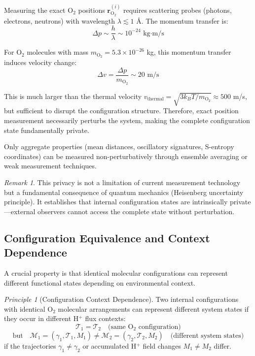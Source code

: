 \documentclass[aps,prd,twocolumn,superscriptaddress,floatfix,nofootinbib]{revtex4-2}
\theoremstyle{remark}
\newtheorem{remark}[theorem]{Remark}
\newtheorem{principle}[theorem]{Principle}
\begin{document}
\begin{justification}
Measuring the exact O$_2$ positions $\mathbf{r}_{\text{O}_2}^{(i)}$ requires scattering probes (photons, electrons, neutrons) with wavelength $\lambda \lesssim 1$ \AA. The momentum transfer is:
$$
\Delta p \sim \frac{h}{\lambda} \sim 10^{-24} \text{ kg·m/s}
$$

For O$_2$ molecules with mass $m_{\text{O}_2} = 5.3 \times 10^{-26}$ kg, this momentum transfer induces velocity change:
$$
\Delta v = \frac{\Delta p}{m_{\text{O}_2}} \sim 20 \text{ m/s}
$$

This is much larger than the thermal velocity $v_{\text{thermal}} = \sqrt{3k_B T / m_{\text{O}_2}} \approx 500$ m/s, but sufficient to disrupt the configuration structure. Therefore, exact position measurement necessarily perturbs the system, making the complete configuration state fundamentally private.

Only aggregate properties (mean distances, oscillatory signatures, S-entropy coordinates) can be measured non-perturbatively through ensemble averaging or weak measurement techniques.
\end{justification}

\begin{remark}
This privacy is not a limitation of current measurement technology but a fundamental consequence of quantum mechanics (Heisenberg uncertainty principle). It establishes that internal configuration states are intrinsically private—external observers cannot access the complete state without perturbation.
\end{remark}

\subsection{Configuration Equivalence and Context Dependence}

A crucial property is that identical molecular configurations can represent different functional states depending on environmental context.

\begin{principle}[Configuration Context Dependence]
\label{princ:nonunique}
Two internal configurations with identical O$_2$ molecular arrangements can represent different system states if they occur in different H$^+$ flux contexts:
\begin{equation}
\mathcal{T}_1 = \mathcal{T}_2 \quad \text{(same O$_2$ configuration)}
\end{equation}
\begin{equation}
\text{but} \quad \mathcal{M}_1 = (\gamma_1, \mathcal{T}_1, M_1) \neq \mathcal{M}_2 = (\gamma_2, \mathcal{T}_2, M_2) \quad \text{(different system states)}
\end{equation}
if the trajectories $\gamma_1 \neq \gamma_2$ or accumulated H$^+$ field changes $M_1 \neq M_2$ differ.
\end{principle}
\end{document}
